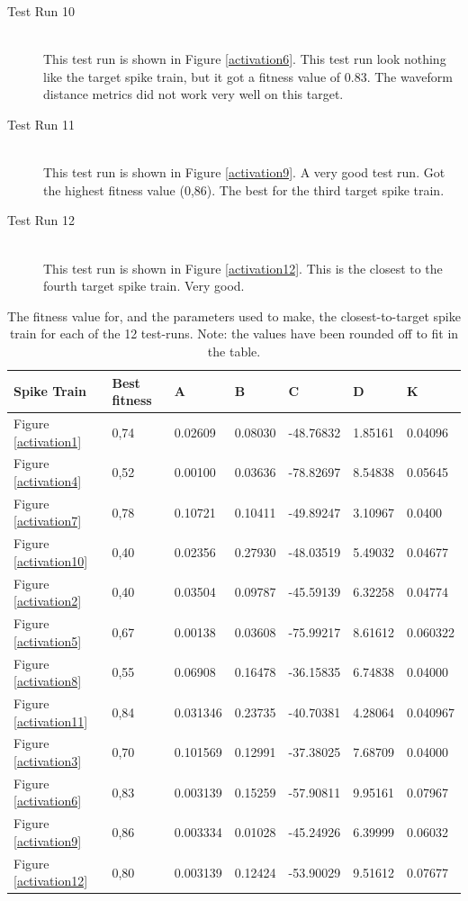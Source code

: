 \documentclass[12pt, a4paper, oneside, titlepage]{article}
\begin{document}
\begin{description}
\item[Test Run 10] \hfill \\
	This test run is shown in Figure \ref{activation6}. This test run look nothing like the target spike train, but it got a fitness value of 0.83. The waveform distance metrics did not work very well on this target.
\item[Test Run 11] \hfill \\
	This test run is shown in Figure \ref{activation9}. A very good test run. Got the highest fitness value (0,86). The best for the third target spike train.
\item[Test Run 12] \hfill \\
	This test run is shown in Figure \ref{activation12}. This is the closest to the fourth target spike train. Very good.
\end{description}

\begin{table}
	\begin{tabular}{|l|l|l|l|l|l|l|} 
	\hline
	Spike Train & Best fitness & A & B& C& D& K \\ \hline
	Figure \ref{activation1} & 0,74 & 	 0.02609& 0.08030&-48.76832& 1.85161	&0.04096\\
	Figure \ref{activation4} & 0,52	&    0.00100& 0.03636&-78.82697& 8.54838	&0.05645\\
	Figure \ref{activation7} & 0,78&	 0.10721& 0.10411& -49.89247&	 3.10967& 0.0400\\
	Figure \ref{activation10} & 0,40&  	 0.02356& 0.27930& -48.03519& 5.49032&	 0.04677\\ \hline
	Figure \ref{activation2} & 0,40&  	 0.03504& 0.09787& -45.59139&	 6.32258&	 0.04774\\
	Figure \ref{activation5} & 0,67&	 0.00138& 0.03608&	 -75.99217&	 8.61612&	 0.060322\\
	Figure \ref{activation8} & 0,55&	 0.06908& 0.16478& -36.15835&	 6.74838& 0.04000\\
	Figure \ref{activation11} & 0,84&	 0.031346& 0.23735&	 -40.70381&	 4.28064&	 0.040967\\ \hline
	Figure \ref{activation3} & 0,70&	 0.101569& 0.12991&	 -37.38025&	 7.68709&	 0.04000\\
	Figure \ref{activation6} & 0,83&	 0.003139& 0.15259& -57.90811&	 9.95161& 0.07967\\
	Figure \ref{activation9} & 0,86&	 0.003334& 0.01028& -45.24926&	 6.39999& 0.06032\\
	Figure \ref{activation12} &0,80&	 0.003139& 0.12424& -53.90029&	 9.51612& 0.07677\\ \hline
	\end{tabular}
	\caption{The fitness value for, and the parameters used to make, the closest-to-target spike train for each of the 12 test-runs. Note: the values have been rounded off to fit in the table.}
	\label{table}
\end{table}
\end{document}
